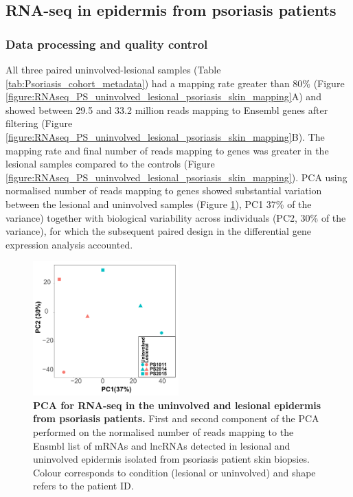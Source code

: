 

\subsection{RNA-seq in epidermis from psoriasis patients}

\subsubsection{Data processing and quality control}
All three paired uninvolved-lesional samples (Table \ref{tab:Psoriasis_cohort_metadata}) had a mapping rate greater than 80\% (Figure \ref{figure:RNAseq_PS_uninvolved_lesional_psoriasis_skin_mapping}A) and showed between 29.5 and 33.2 million reads mapping to Ensembl genes after filtering (Figure \ref{figure:RNAseq_PS_uninvolved_lesional_psoriasis_skin_mapping}B). The mapping rate and final number of reads mapping to genes was greater in the lesional samples compared to the controls (Figure \ref{figure:RNAseq_PS_uninvolved_lesional_psoriasis_skin_mapping}). PCA using normalised number of reads mapping to genes showed substantial variation between the lesional and uninvolved samples (Figure \ref{figure:RNAseq_PS_lesional_uninvolved_PCA}), PC1 37\% of the variance) together with biological variability across individuals (PC2, 30\% of the variance), for which the subsequent paired design in the differential gene expression analysis accounted.  


\begin{figure}[htbp]
\centering
\includegraphics[width=0.5\textwidth]{./Results2/pdfs/PS_lesional_uninvolved_varied_PCA1and2_plot}
\caption[PCA for RNA-seq in the uninvolved and lesional epidermis from psoriasis patients.]{\textbf{PCA for RNA-seq in the uninvolved and lesional epidermis from psoriasis patients.} First and second component of the PCA performed on the normalised number of reads mapping to the Ensmbl list of mRNAs and lncRNAs detected in lesional and uninvolved epidermis isolated from psoriasis patient skin biopsies. Colour corresponds to condition (lesional or uninvolved) and shape refers to the patient ID.}
\label{figure:RNAseq_PS_lesional_uninvolved_PCA}
\end{figure}




